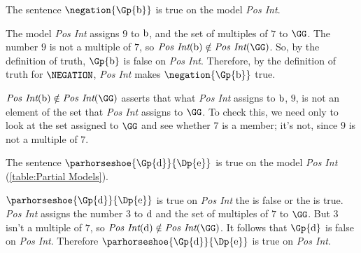 \begin{majorILnc}{}
	The sentence $\negation{\Gp{\constant{b}}}$ is true on the model \emph{Pos Int}. 
\end{majorILnc}
\begin{PROOF}
	The model \emph{Pos Int} assigns $9$ to $\mathrm{b}$, and the set of multiples of $7$ to $\GG$.
	The number $9$ is not a multiple of $7$, so $\emph{Pos Int}(\constant{b})\notin\emph{Pos Int}(\GG)$.
	So, by the definition of truth, $\Gp{\constant{b}}$ is false on \emph{Pos Int}.
	Therefore, by the definition of truth for $\NEGATION$, \emph{Pos Int} makes $\negation{\Gp{\constant{b}}}$ true.

\end{PROOF}
\begin{commentary}
	$\emph{Pos Int}(\constant{b})\notin\emph{Pos Int}(\GG)$ asserts that what \emph{Pos Int} assigns to $\mathrm{b}$, $9$, is not an element of the set that \emph{Pos Int} assigns to $\GG$.
	To check this, we need only to look at the set assigned to $\GG$ and see whether $7$ is a member; it's not, since $9$ is not a multiple of $7$.
\end{commentary}

\begin{majorILnc}{}
The sentence ${\parhorseshoe{\Gp{\constant{d}}}{\Dp{\constant{e}}}}$ is true on the model \emph{Pos Int} (\ref{table:Partial Models}). 
\end{majorILnc}
\begin{PROOF}
$\parhorseshoe{\Gp{\constant{d}}}{\Dp{\constant{e}}}$ is true on \emph{Pos Int} \Iff the  is false or the  is true.
\emph{Pos Int} assigns the number $3$ to $\mathrm{d}$ and the set of multiples of $7$ to $\GG$.
But $3$ isn't a multiple of $7$, so $\emph{Pos Int}(\constant{d})\notin\emph{Pos Int}(\GG)$.
It follows that $\Gp{\constant{d}}$ is false on \emph{Pos Int}.
Therefore $\parhorseshoe{\Gp{\constant{d}}}{\Dp{\constant{e}}}$ is true on \emph{Pos Int}.
\end{PROOF}

